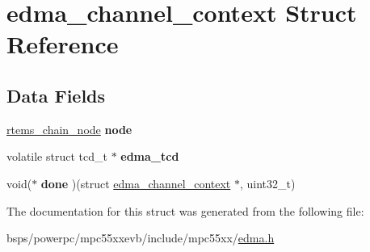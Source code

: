 \hypertarget{structedma__channel__context}{}\section{edma\+\_\+channel\+\_\+context Struct Reference}
\label{structedma__channel__context}
\subsection*{Data Fields}
\begin{DoxyCompactItemize}
\item 
\mbox{\label{structedma__channel__context_a59e0b4f8def58740d8edd9722bfc397d}} 
\mbox{\hyperlink{structChain__Node__struct}{rtems\+\_\+chain\+\_\+node}} {\bfseries node}
\item 
\mbox{\label{structedma__channel__context_aaa44aa6b6648ca6953fafe867da18e26}} 
volatile struct tcd\+\_\+t $\ast$ {\bfseries edma\+\_\+tcd}
\item 
\mbox{\label{structedma__channel__context_a5d1387a4fb9f0bba53867abefe4e1f02}} 
void($\ast$ {\bfseries done} )(struct \mbox{\hyperlink{structedma__channel__context}{edma\+\_\+channel\+\_\+context}} $\ast$, uint32\+\_\+t)
\end{DoxyCompactItemize}


The documentation for this struct was generated from the following file\+:\begin{DoxyCompactItemize}
\item 
bsps/powerpc/mpc55xxevb/include/mpc55xx/\mbox{\hyperlink{edma_8h}{edma.\+h}}\end{DoxyCompactItemize}

